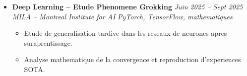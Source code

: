 \documentclass[a4paper,11pt]{article}
\begin{document}
\begin{itemize}[leftmargin=*, label={-}]
\item \textbf{Deep Learning -- Etude Phenomene Grokking} \hfill \textit{Juin 2025 -- Sept 2025} \\
\textit{MILA -- Montreal Institute for AI} \hfill \textit{PyTorch, TensorFlow, mathematiques}
\vspace{-2pt}
    \begin{itemize}[leftmargin=0.4cm, nosep, label=\tiny$\bullet$]
        \item \small{Etude de generalisation tardive dans les reseaux de neurones apres suraprentissage.}
        \item \small{Analyse mathematique de la convergence et reproduction d'experiences SOTA.}
    \end{itemize}

\end{itemize}
\end{document}
